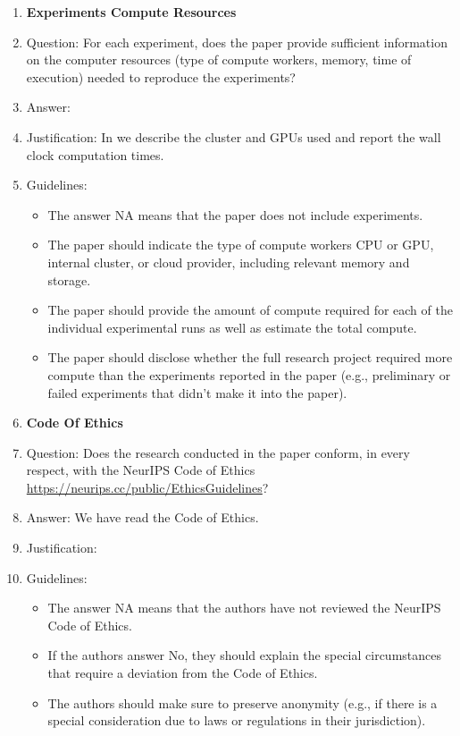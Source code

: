 \begin{enumerate}
\item {\bf Experiments Compute Resources}
\item[] Question: For each experiment, does the paper provide sufficient information on the computer resources (type of compute workers, memory, time of execution) needed to reproduce the experiments?
\item[] Answer: \answerYes{} %
\item[] Justification: \justificationTODO{}
  In  we describe the cluster and GPUs used and report the wall clock computation times.
\item[] Guidelines:
  \begin{itemize}
  \item The answer NA means that the paper does not include experiments.
  \item The paper should indicate the type of compute workers CPU or GPU, internal cluster, or cloud provider, including relevant memory and storage.
  \item The paper should provide the amount of compute required for each of the individual experimental runs as well as estimate the total compute.
  \item The paper should disclose whether the full research project required more compute than the experiments reported in the paper (e.g., preliminary or failed experiments that didn't make it into the paper).
  \end{itemize}

\item {\bf Code Of Ethics}
\item[] Question: Does the research conducted in the paper conform, in every respect, with the NeurIPS Code of Ethics \url{https://neurips.cc/public/EthicsGuidelines}?
\item[] Answer: \answerYes{} We have read the Code of Ethics.  %
\item[] Justification: \justificationTODO{}
\item[] Guidelines:
  \begin{itemize}
  \item The answer NA means that the authors have not reviewed the NeurIPS Code of Ethics.
  \item If the authors answer No, they should explain the special circumstances that require a deviation from the Code of Ethics.
  \item The authors should make sure to preserve anonymity (e.g., if there is a special consideration due to laws or regulations in their jurisdiction).
  \end{itemize}



\end{enumerate}
